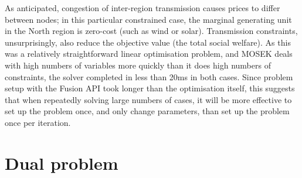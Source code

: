 \documentclass[11pt,a4paper]{article}
\numberwithin{equation}{section}
\begin{document}
\cite{hodgeWindPowerForecasting2012}

\begin{table}[htbp]
    \centering

    \caption{Market clearing summary}
    \label{tab:summary}
\end{table}

As anticipated, congestion of inter-region transmission causes prices to differ between nodes; in this particular constrained case, the marginal generating unit in the North region is zero-cost (such as wind or solar).
Transmission constraints, unsurprisingly, also reduce the objective value (the total social welfare).
As this was a relatively straightforward linear optimisation problem, and MOSEK deals with high numbers of variables more quickly than it does high numbers of constraints, the solver completed in less than 20ms in both cases.
Since problem setup with the Fusion API took longer than the optimisation itself, this suggests that when repeatedly solving large numbers of cases, it will be more effective to set up the problem once, and only change parameters, than set up the problem once per iteration.

\FloatBarrier

\section{Dual problem}
\label{sec:dual}
\end{document}
